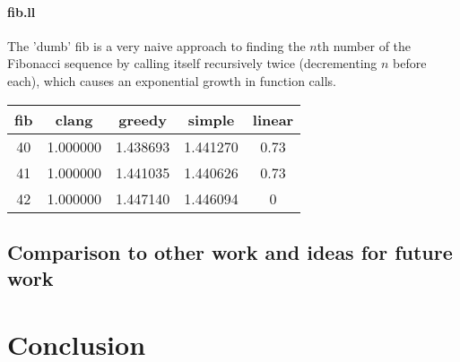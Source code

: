 \documentclass{article}
\begin{document}
\paragraph{fib.ll}
The 'dumb' fib is a very naive approach to finding the \(n\)th number of the Fibonacci sequence by calling itself recursively twice (decrementing \(n\) before each), which causes an exponential growth in function calls.
\color{black}
\begin{center}
\begin{tabular}{|c||c|c|c|c|} 
 \hline
 fib & clang & greedy & simple & linear \\ [0.5ex] 
 \hline
 40 & 1.000000 & 1.438693 & 1.441270 & 0.73 \\ [1ex] 
 41 & 1.000000 & 1.441035 & 1.440626 & 0.73 \\ [1ex] 
 42 & 	1.000000 & 1.447140 & 1.446094 & 0\\
 \hline
\end{tabular}
\end{center}

 





\subsection{Comparison to other work and ideas for future work}


\section{Conclusion}




\printbibliography 


\appendix

\newpage

\end{document}
